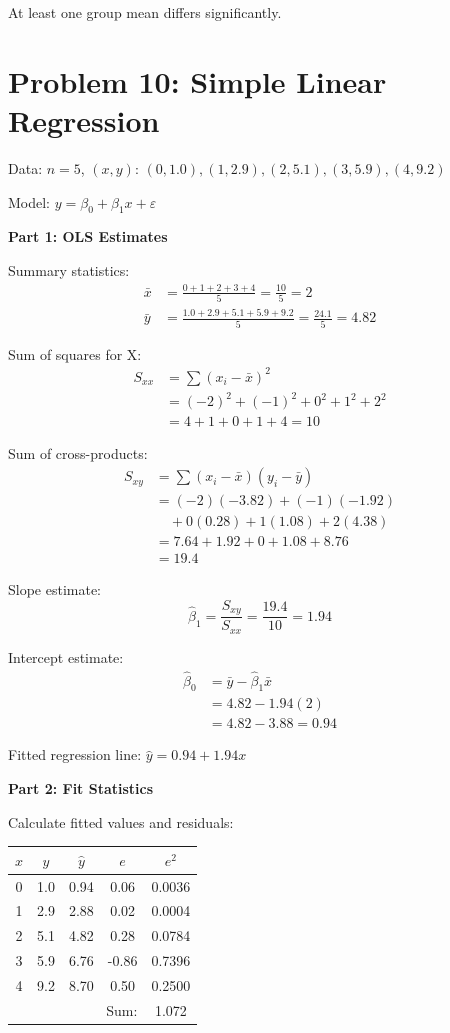 \documentclass[10pt,twocolumn]{article}
\begin{document}
At least one group mean differs significantly.

\section*{Problem 10: Simple Linear Regression}

Data: $n=5$, $(x,y)$: $(0,1.0), (1,2.9), (2,5.1), (3,5.9), (4,9.2)$

Model: $y = \beta_0 + \beta_1 x + \varepsilon$

\textbf{Part 1: OLS Estimates}

Summary statistics:
\begin{align*}
\bar{x} &= \frac{0+1+2+3+4}{5} = \frac{10}{5} = 2 \\
\bar{y} &= \frac{1.0+2.9+5.1+5.9+9.2}{5} = \frac{24.1}{5} = 4.82
\end{align*}

Sum of squares for X:
\begin{align*}
S_{xx} &= \sum(x_i - \bar{x})^2 \\
&= (-2)^2+(-1)^2+0^2+1^2+2^2 \\
&= 4+1+0+1+4 = 10
\end{align*}

Sum of cross-products:
\begin{align*}
S_{xy} &= \sum(x_i - \bar{x})(y_i - \bar{y}) \\
&= (-2)(-3.82) + (-1)(-1.92) \\
&\quad + 0(0.28) + 1(1.08) + 2(4.38) \\
&= 7.64 + 1.92 + 0 + 1.08 + 8.76 \\
&= 19.4
\end{align*}

Slope estimate:
$$\hat{\beta}_1 = \frac{S_{xy}}{S_{xx}} = \frac{19.4}{10} = \boxed{1.94}$$

Intercept estimate:
\begin{align*}
\hat{\beta}_0 &= \bar{y} - \hat{\beta}_1\bar{x} \\
&= 4.82 - 1.94(2) \\
&= 4.82 - 3.88 = \boxed{0.94}
\end{align*}

Fitted regression line: $\hat{y} = 0.94 + 1.94x$

\textbf{Part 2: Fit Statistics}

Calculate fitted values and residuals:

\begin{small}
\begin{tabular}{ccccc}
$x$ & $y$ & $\hat{y}$ & $e$ & $e^2$ \\
\hline
0 & 1.0 & 0.94 & 0.06 & 0.0036 \\
1 & 2.9 & 2.88 & 0.02 & 0.0004 \\
2 & 5.1 & 4.82 & 0.28 & 0.0784 \\
3 & 5.9 & 6.76 & -0.86 & 0.7396 \\
4 & 9.2 & 8.70 & 0.50 & 0.2500 \\
\hline
\multicolumn{4}{r}{Sum:} & 1.072 \\
\end{tabular}
\end{small}
\end{document}
